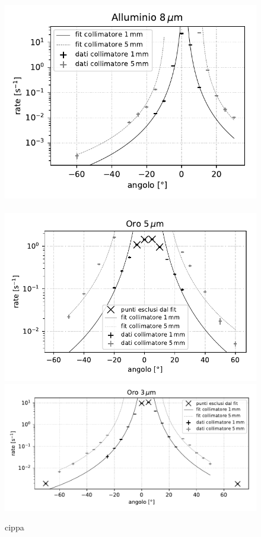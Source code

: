 \begin{figure}
	\hspace{-0.2\textwidth}
	{\includegraphics[height=0.5\textwidth]{immagini/all}}
	~
	{\includegraphics[height=0.5\textwidth]{immagini/oro5}}
	\includegraphics[height=0.5\textwidth]{immagini/oro3}
	\caption{\label{fig:fit}
	cippa}
\end{figure}

